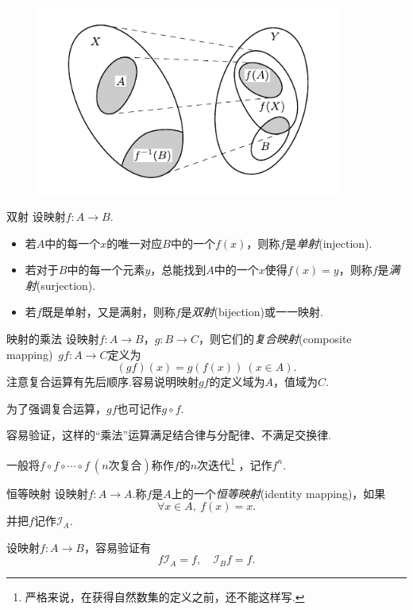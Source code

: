 \begin{figure}[h!]
	\centering
	\includegraphics[width=10cm]{attachment/Acr1745354698752707434.pdf}
\end{figure}

\begin{definition}{双射}
	设映射$f:A \to B$.
	\begin{itemize}
		\item 若$A$中的每一个$x$的唯一对应$B$中的一个$f(x)$，则称$f$是\textit{单射}(injection).
		\item 若对于$B$中的每一个元素$y$，总能找到$A$中的一个$x$使得$f(x)=y$，则称$f$是\textit{满射}(surjection).
		\item 若$f$既是单射，又是满射，则称$f$是\textit{双射}(bijection)或一一映射.
	\end{itemize}
\end{definition}

\begin{definition}{映射的乘法}
    设映射$f:A \to B$，$g:B \to C$，则它们的\textit{复合映射}(composite mapping)~$gf:A \to C$定义为$$(gf)(x)=g(f(x)) \ (x \in A).$$
    注意复合运算有先后顺序.容易说明映射$gf$的定义域为$A$，值域为$C$.
\end{definition}
\begin{remark}
	为了强调复合运算，$gf$也可记作$g \circ f$.
\end{remark}

容易验证，这样的“乘法”运算满足结合律与分配律、不满足交换律.

一般将$f \circ f \circ \cdots \circ f~(n\textit{次复合})$称作$f$的$n$次迭代\footnote{严格来说，在获得自然数集的定义之前，还不能这样写.} ，记作$f^n$.

\begin{definition}{恒等映射}
	设映射$f:A \to A$.称$f$是$A$上的一个\textit{恒等映射}(identity mapping)，如果$$\forall x\in A,~f(x)=x.$$
	并把$f$记作$\mathcal{I}_A$.
\end{definition}
\begin{remark}
	设映射$f : A \to B$，容易验证有$$f\mathcal{I}_A=f,\quad \mathcal{I}_Bf=f.$$
\end{remark}

